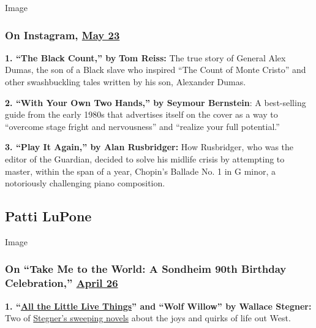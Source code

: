 Image

\hypertarget{on-instagram-may-23}{%
\subsubsection{\texorpdfstring{On Instagram,
\href{https://www.instagram.com/tv/CAiTOS-FQaA/?utm_source=ig_web_copy_link}{May
23}}{On Instagram, May 23}}\label{on-instagram-may-23}}

\textbf{1. ``The Black Count,'' by} \textbf{Tom Reiss:} The true story
of General Alex Dumas, the son of a Black slave who inspired ``The Count
of Monte Cristo'' and other swashbuckling tales written by his son,
Alexander Dumas.

\textbf{2. ``With Your Own Two Hands,'' by Seymour Bernstein}: A
best-selling guide from the early 1980s that advertises itself on the
cover as a way to ``overcome stage fright and nervousness'' and
``realize your full potential.''

\textbf{3. ``Play It Again,'' by Alan Rusbridger:} How Rusbridger, who
was the editor of the Guardian, decided to solve his midlife crisis by
attempting to master, within the span of a year, Chopin's Ballade No. 1
in G minor, a notoriously challenging piano composition.

\hypertarget{patti-lupone}{%
\subsection{Patti LuPone}\label{patti-lupone}}

Image

\hypertarget{on-take-me-to-the-world-a-sondheim-90th-birthday-celebration-april-26}{%
\subsubsection{\texorpdfstring{On ``Take Me to the World: A Sondheim
90th Birthday Celebration,''
\href{https://www.youtube.com/watch?v=A92wZIvEUAw\&t=7694s}{April
26}}{On ``Take Me to the World: A Sondheim 90th Birthday Celebration,'' April 26}}\label{on-take-me-to-the-world-a-sondheim-90th-birthday-celebration-april-26}}

\textbf{1.
``\href{https://timesmachine.nytimes.com/timesmachine/1967/08/06/94111427.html?pageNumber=230}{All
the Little Live Things}'' and ``Wolf Willow'' by Wallace Stegner:} Two
of
\href{https://www.nytimes.com/2020/06/01/books/review/wallace-stegner-west-angle-of-repose-big-rock-candy-mountain-crossing-to-safety.html}{Stegner's
sweeping novels} about the joys and quirks of life out West.

